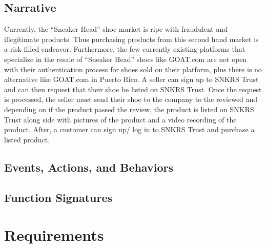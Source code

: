 \subsection{Narrative}
\hspace{1cm} Currently, the ``Sneaker Head'' shoe market is ripe with fraudulent and illegitimate products. Thus purchasing products from this second hand market is a risk filled endeavor. Furthermore, the few currently existing platforms that specialize in the resale of ``Sneaker Head'' shoes like GOAT.com are not open with their authentication process for shoes sold on their platform, plus there is no alternative like GOAT.com in Puerto Rico. A seller can sign up to SNKRS Trust and can then request that their shoe be listed on SNKRS Trust. Once the request is processed, the seller must send their shoe to the company to the reviewed and depending on if the product passed the review, the product is listed on SNKRS Trust along side with pictures of the product and a video recording of the product. After, a customer can sign up/ log in to SNKRS Trust and purchase a listed product.
\subsection{Events, Actions, and Behaviors}
\subsection{Function Signatures}
\newpage
\section{Requirements}
